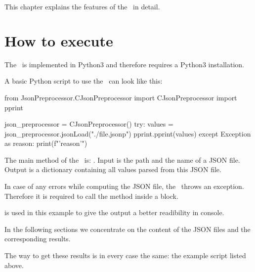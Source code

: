 



This chapter explains the features of the \pkg\ in detail.

\section{How to execute}

The \pkg\ is implemented in Python3 and therefore requires a Python3 installation.

A basic Python script to use the \pkg\ can look like this:

\begin{pythoncode}
from JsonPreprocessor.CJsonPreprocessor import CJsonPreprocessor
import pprint

json_preprocessor = CJsonPreprocessor()
try:
   values = json_preprocessor.jsonLoad("./file.jsonp")
   pprint.pprint(values)
except Exception as reason:
   print(f"'{reason}'")
\end{pythoncode}

The main method of the \pkg\ is: . Input is the path and the name of a JSON file.
Output is a dictionary containing all values parsed from this JSON file.

In case of any errors while computing the JSON file, the \pkg\ throws an exception. Therefore it is required
to call the method  inside a  block.

 is used in this example to give the output a better readibility in console.

In the following sections we concentrate on the content of the JSON files and the corresponding results.

The way to get these results is in every case the same: the example script listed above.


